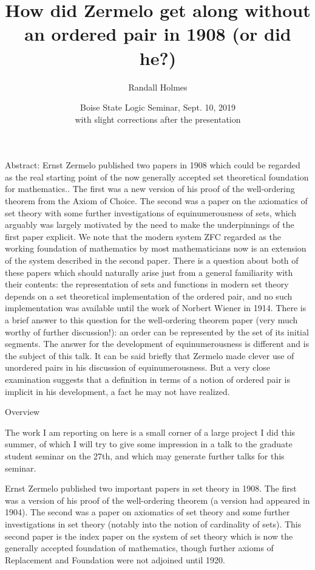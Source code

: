 \documentclass{slides}
\title{How did Zermelo get along without an ordered pair in 1908 (or did he?)}
\author{Randall Holmes}
\date{Boise State Logic Seminar, Sept. 10, 2019\\ with slight corrections after the presentation}
\begin{document}
\begin{slide}

\maketitle

\end{slide}

\begin{slide}

{\tiny

Abstract: Ernst Zermelo published two papers in 1908 which could be regarded as the real starting point of the now generally accepted set theoretical foundation for mathematics..  The first was a new version of his proof of the well-ordering theorem from the Axiom of Choice.  The second was a paper on the axiomatics of set theory with some further investigations of equinumerousness of sets, which arguably was largely motivated by the need to make the underpinnings of the first paper explicit.  We note that the modern system ZFC regarded as the working foundation of mathematics by most mathematicians now is an extension of the system described in the second paper.  There is a question about both of these papers which should naturally arise just from a general familiarity with their contents:  the representation of sets and functions in modern set theory depends on a set theoretical implementation of the ordered pair, and no such implementation was available until the work of Norbert Wiener in 1914.  There is a brief answer to this question for the well-ordering theorem paper (very much worthy of further discussion!):  an order can be represented by the set of its initial segments.  The answer for the development of equinumerousness is different and is the subject of this talk.  It can be said briefly that Zermelo made clever use of unordered pairs in his discussion of equinumerousness.  But a very close examination suggests that a definition in terms of a notion of ordered pair is implicit in his development, a fact he may not have realized.}



\end{slide}

\begin{slide}

{\Large Overview}

The work I am reporting on here is a small corner of a large project I did this summer, of which I will try to give some impression in a talk to the graduate student seminar on the 27th,
and which may generate further talks for this seminar.

Ernst Zermelo published two important papers in set theory in 1908.  The first was a version of his proof of the well-ordering theorem (a version had appeared in 1904).  The second was a paper on axiomatics of set theory and some further investigations in set theory (notably into the notion of cardinality of sets).  This second paper is the index paper on the system of set theory which is now the generally accepted foundation of mathematics, though further axioms of Replacement and Foundation were not adjoined until 1920.
\end{slide}
\end{document}
